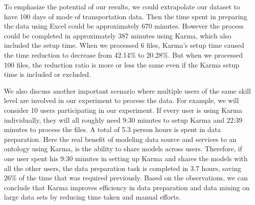 To emphasize the potential of our results, we could extrapolate our dataset to have 100 days of mode of transportation data. Then the time spent in preparing the data using Excel could be approximately 670 minutes. However the process could be completed in approximately 387 minutes using Karma, which also included the setup time. When we processed 6 files, Karma's setup time caused the time reduction to decrease from 42.14\% to 20.28\%. But when we processed 100 files, the reduction ratio is more or less the same even if the Karma setup time is included or excluded. 

We also discuss another important scenario where multiple users of the same skill level are involved in our experiment to process the data. For example, we will consider 10 users participating in our experiment. If every user is using Karma individually, they will all roughly need 9:30 minutes to setup Karma and 22:39 minutes to process the files. A total of 5.3 person hours is spent in data preparation. Here the real benefit of modeling data source and services to an ontology using Karma, is the ability to share models across users. Therefore, if one user spent his 9:30 minutes in setting up Karma and shares the models with all the other users, the data preparation task is completed in 3.7 hours, saving 26\% of the time that was required previously. Based on the observations, we can conclude that Karma improves efficiency in data preparation and data mining on large data sets by reducing time taken and manual efforts.